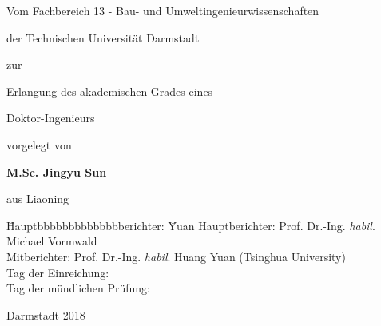 %

\begin{titlepage}                  %
\renewcommand{\baselinestretch}{1.0}
\begin{center}

    {\bf\huge{} \par}
    {\bf\huge{} \par}
    {\bf\huge{} \par}
\vspace*{15mm}

    {{Vom Fachbereich 13 - Bau- und Umweltingenieurwissenschaften\par}}
\vspace*{2mm}
    {{der Technischen Universit\"{a}t Darmstadt \par}}


\vspace*{15mm}
    {{zur \par}}
\vspace*{2mm}
    {{Erlangung des akademischen Grades eines \par}}
\vspace*{2mm}
    {{Doktor-Ingenieurs \par}}


\vspace*{10mm}
    {{vorgelegt von} \par}
\vspace*{2mm}
    {{\large \bf M.Sc. Jingyu Sun} \par}
\vspace*{2mm}
    {{aus Liaoning \par}}

\vspace*{2mm}

\vspace*{28mm}
\vspace*{10mm}

{
\begin{tabbing}
\hspace*{23mm}
\=Hauptbbbbbbbbbbbbbberichter: \=Yuan\kill
\>Hauptberichter: \>Prof. Dr.-Ing. \emph{habil}. Michael Vormwald\\
\>Mitberichter: \> Prof. Dr.-Ing. \emph{habil}. Huang Yuan (Tsinghua University)\\
\>Tag der Einreichung:\>\\
\>Tag der m\"{u}ndlichen Pr\"{u}fung:\>\\
\end{tabbing}
}

\vspace*{10mm}
	{{Darmstadt 2018}}



\end{center}

\end{titlepage}
